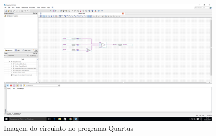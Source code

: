 \begin{figure}[htb]
    \centering
	\caption{\label{fig:printCircuito}Imagem do circuinto no programa Quartus}
	\includegraphics[width=1\textwidth]{img/cenario2/printCircuito}
\end{figure}




